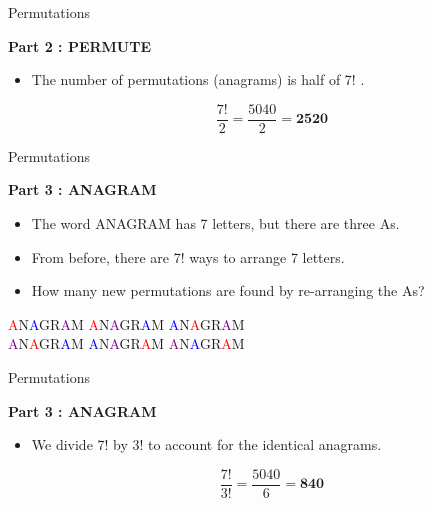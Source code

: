 
{Permutations}

\textbf{Part 2 : PERMUTE}\\
\begin{itemize}
\item The number of permutations (anagrams) is half of 7! .

\[\frac{7!}{2} =  \frac{5040}{2} = \boldsymbol{2520} \]
\end{itemize}



{Permutations}

\textbf{Part 3 : ANAGRAM}\\
\begin{itemize}
\item The word ANAGRAM has 7 letters, but there are three As.
\item From before, there are 7! ways to arrange 7 letters.
\item How many new permutations are found by re-arranging the As?
\end{itemize}

\begin{center}
\textcolor{red}{A}N\textcolor{blue}{A}GR\textcolor{purple}{A}M \; 
\textcolor{red}{A}N\textcolor{purple}{A}GR\textcolor{blue}{A}M \; 
\textcolor{blue}{A}N\textcolor{red}{A}GR\textcolor{purple}{A}M \; \\
\textcolor{purple}{A}N\textcolor{red}{A}GR\textcolor{blue}{A}M \; 
\textcolor{blue}{A}N\textcolor{purple}{A}GR\textcolor{red}{A}M \; 
\textcolor{purple}{A}N\textcolor{blue}{A}GR\textcolor{red}{A}M \; 
\end{center}



{Permutations}

\textbf{Part 3 : ANAGRAM}\\
\begin{itemize}
\item We divide 7! by 3! to account for the identical anagrams.

\[\frac{7!}{3!} =  \frac{5040}{6} = \boldsymbol{840} \]
\end{itemize}



